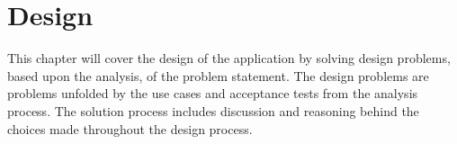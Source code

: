 \chapter{Design}
This chapter will cover the design of the application by solving design problems, based upon the analysis, of the problem statement. The design problems are problems unfolded by the use cases and acceptance tests from the analysis process. The solution process includes discussion and reasoning behind the choices made throughout the design process.








